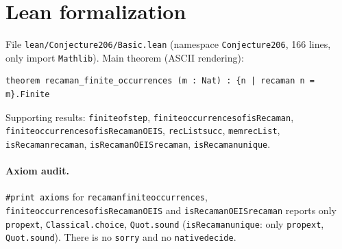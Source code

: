 \documentclass[11pt]{article}
\theoremstyle{definition}
\theoremstyle{remark}
\renewcommand{\_}{\oldus\allowbreak}
\begin{document}
\section{Lean formalization}

File \texttt{lean/Conjecture206/Basic.lean} (namespace \texttt{Conjecture206}, 166 lines, only import
\texttt{Mathlib}). Main theorem (ASCII rendering):
\begin{verbatim}
theorem recaman_finite_occurrences (m : Nat) : {n | recaman n = m}.Finite
\end{verbatim}
Supporting results: \texttt{finite\_of\_step}, \texttt{finite\_occurrences\_of\_isRecaman},
\texttt{finite\_occurrences\_of\_isRecamanOEIS}, \texttt{recList\_succ}, \texttt{mem\_recList},
\texttt{isRecaman\_recaman}, \texttt{isRecamanOEIS\_recaman}, \texttt{isRecaman\_unique}.

\paragraph{Axiom audit.} \texttt{\#print axioms} for \texttt{recaman\_finite\_occurrences},
\texttt{finite\_occurrences\_of\_isRecamanOEIS} and \texttt{isRecamanOEIS\_recaman} reports only
\texttt{propext}, \texttt{Classical.choice}, \texttt{Quot.sound} (\texttt{isRecaman\_unique}: only
\texttt{propext}, \texttt{Quot.sound}). There is no \texttt{sorry} and no \texttt{native\_decide}.
\end{document}
